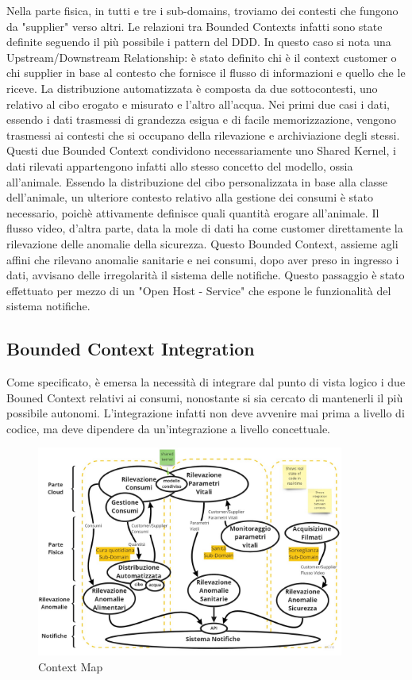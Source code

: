     Nella parte fisica, in tutti e tre i sub-domains, troviamo dei contesti che fungono da "supplier" verso altri. Le relazioni tra Bounded Contexts infatti sono state definite seguendo il più possibile i pattern del DDD. In questo caso si nota una Upstream/Downstream Relationship: è stato definito chi è il context customer o chi supplier in base al contesto che fornisce il flusso di informazioni e quello che le riceve. 
    La distribuzione automatizzata è composta da due sottocontesti, uno relativo al cibo erogato e misurato e l'altro all'acqua.
    Nei primi due casi i dati, essendo i dati trasmessi di grandezza esigua e di facile memorizzazione, vengono trasmessi ai contesti che si occupano della rilevazione e archiviazione degli stessi. Questi due Bounded Context condividono necessariamente uno Shared Kernel, i dati rilevati appartengono infatti allo stesso concetto del modello, ossia all'animale. 
    Essendo la distribuzione del cibo personalizzata in base alla classe dell'animale, un ulteriore contesto relativo alla gestione dei consumi è stato necessario, poichè attivamente definisce quali quantità erogare all'animale.
    Il flusso video, d'altra parte, data la mole di dati ha come customer direttamente la rilevazione delle anomalie della sicurezza. Questo Bounded Context, assieme agli affini che rilevano anomalie sanitarie e nei consumi, dopo aver preso in ingresso i dati, avvisano delle irregolarità il sistema delle notifiche. Questo passaggio è stato effettuato per mezzo di un "Open Host - Service" che espone le funzionalità del sistema notifiche.

    \subsection{Bounded Context Integration}
    Come specificato, è emersa la necessità di integrare dal punto di vista logico i due Bouned Context relativi ai consumi, nonostante si sia cercato di mantenerli il più possibile autonomi. L'integrazione infatti non deve avvenire mai prima a livello di codice, ma deve dipendere da un'integrazione a livello concettuale. 

    \begin{figure}[ht]
        \caption{Context Map}
        \label{fig:ContextMap}
        \centering
        \includegraphics[width=0.9\textwidth]{Miro/ContextMap.jpg}
    \end{figure}
    